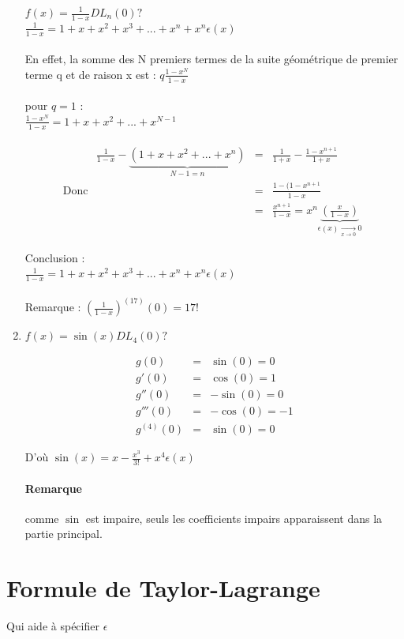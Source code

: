 \begin{enumerate}
	$f(x) = \frac{1}{1-x} DL_n(0) ?$ ~\\
	$\frac{1}{1-x} = 1+x+x^2+x^3 + ... + x^n + x^n\epsilon(x)$ ~\\ ~\\
	En effet, la somme des N premiers termes de la suite géométrique de premier terme q et de raison x est : $q\frac{1-x^N}{1-x}$ ~\\ ~\\
	pour $q=1$ : ~\\
	$\frac{1-x^N}{1-x} = 1+x+x^2+...+x^{N-1}$ ~\\ ~\\
	\[\text{Donc } \begin{array}{rcl}
			\frac{1}{1-x} - \underbrace{(1+x+x^2 + ...+x^n)}_{N-1=n} &=& \frac{1}{1+x} - \frac{1-x^{n+1}}{1+x} \\
				   &=& \frac{1-(1-x^{n+1}}{1-x} \\
				   &=& \frac{x^{n+1}}{1-x} = x^n \underbrace{(\frac{x}{1-x})}_{\epsilon (x) \xrightarrow[x \to 0]{} 0}
	\end{array}\]

	Conclusion : ~\\
	$\frac{1}{1-x} = 1+x+x^2+x^3 +...+x^n + x^n\epsilon(x)$ ~\\ ~\\
	Remarque : $(\frac{1}{1-x})^{(17)} (0) = 17!$

\item $f(x) = \sin(x) DL_4(0) ?$

	\[\begin{array}{rcl}
			g(0) &=& \sin(0) = 0 \\
			g'(0) &=& \cos(0) = 1 \\
			g''(0) &=& -\sin(0) = 0 \\
			g'''(0) &=& -\cos(0) = -1 \\
			g^{(4)}(0) &=& \sin(0) = 0
	\end{array}\]

	D'où $\sin(x) = x - \frac{x^3}{3!} + x^4 \epsilon (x)$


	\paragraph{Remarque} comme $\sin$ est impaire, seuls les coefficients impairs apparaissent dans la partie principal.
	\end{enumerate}

	\section{Formule de Taylor-Lagrange} Qui aide à spécifier $\epsilon$

